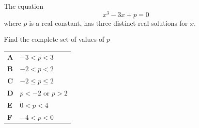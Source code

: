 \documentclass[11pt,a4paper]{article}
\begin{document}
\clearpage
\thispagestyle{djspaper}
\vspace*{8pt}
\begin{enumerate}[label=\textbf{\arabic*.},leftmargin=*,itemsep=0pt,start=20]
\questionitem[Polynomials]
The equation \[x^3 - 3x + p = 0\] where $p$ is a real constant, has three distinct real solutions for $x$.

Find the complete set of values of $p$

\par\vspace*{12pt}
\begin{tabularx}{\linewidth}{@{}>{\bfseries}l Y@{}}
A &
$-3 < p < 3$
\\[0.8em]
B &
$-2 < p < 2$
\\[0.8em]
C &
$-2 \le p \le 2$
\\[0.8em]
D &
$p < -2$ or $p > 2$
\\[0.8em]
E &
$0 < p < 4$
\\[0.8em]
F &
$-4 < p < 0$
\\
\end{tabularx}
\end{enumerate}
\end{document}
